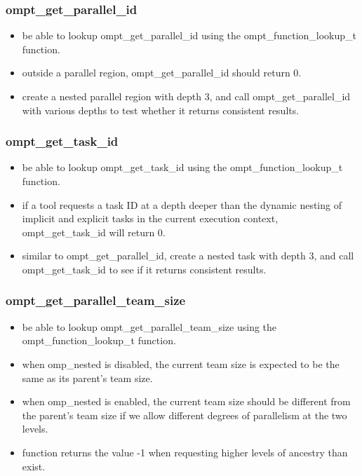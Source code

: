 \documentclass{article}
\begin{document}
\subsubsection{ompt\_get\_parallel\_id}

    \begin{itemize}
        \item  be able to lookup ompt\_get\_parallel\_id using the ompt\_function\_lookup\_t function.
        \item outside a parallel region, ompt\_get\_parallel\_id should return 0.
        \item create a nested parallel region with depth 3, and call ompt\_get\_parallel\_id with various depths to test whether it returns consistent 
                 results. 
    \end{itemize}


\subsubsection{ompt\_get\_task\_id}

    \begin{itemize}
        \item  be able to lookup ompt\_get\_task\_id using the ompt\_function\_lookup\_t function.
        \item if a tool requests a task ID at a depth deeper than the dynamic nesting of implicit and explicit tasks in the current execution context, ompt\_get\_task\_id will return 0.
        \item similar to ompt\_get\_parallel\_id, create a nested task with depth 3, and call ompt\_get\_task\_id to see if it returns consistent results.
    \end{itemize}


\subsubsection{ompt\_get\_parallel\_team\_size}

    \begin{itemize}
        \item  be able to lookup ompt\_get\_parallel\_team\_size using the ompt\_function\_lookup\_t function.
        \item when omp\_nested is disabled,  the current  team size is expected to be the same as its parent’s team size.
        \item when omp\_nested is enabled, the current team size should be different from the parent’s team size if we allow different degrees of parallelism at the two levels.
        \item function returns the value -1 when requesting higher levels of ancestry than exist.
    \end{itemize}
\end{document}
